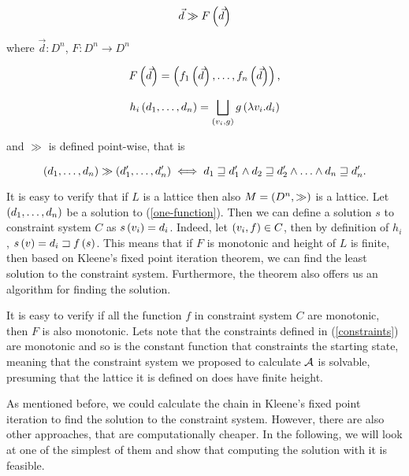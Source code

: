 \documentclass[..thesis.tex]{subfiles}
\begin{document}
\begin{equation}
  \label{one-function}
  \vec{d} \gg F \left( \vec{d}  \right) 
\end{equation}


where $\vec{d} : D^n$, $F :  D^{n} \to D^{n}$

\begin{equation*}
  F \left( \vec{d} \right)  = \left( f_1 \left( \vec{d} \right) , \ldots, f_n \left( \vec{d} \right) \right) \text{,}
\end{equation*}   


\begin{equation*}
  h_i \left( d_1, \ldots, d_n \right) = \bigsqcup_{\left( v_i, g \right)} g \left( \lambda v_i. d_i \right)
\end{equation*}

and $\gg$ is defined point-wise, that is 

\begin{equation*}
\left( d_1, \ldots, d_n \right) \gg \left( d_1', \ldots, d_n' \right) \iff  d_1 \sqsupseteq d_1' \land d_2 \sqsupseteq d_2' \land \ldots \land d_n \sqsupseteq d_n' \text{.}
\end{equation*}

It is easy to verify that if $L$ is a lattice then also $M = \left( D^n, \gg \right)$ is a lattice. Let $\left( d_1, \ldots, d_n \right) $ be a solution to (\ref{one-function}). Then we can define a solution $s$ to constraint system $C$ as $s \left( v_i \right) = d_i$. Indeed, let $ \left( v_i, f \right) \in C$, then by definition of $h_i$, $s \left( v \right) = d_i \sqsupset f \left( s \right)$. This means that if $F$ is monotonic and height of $L$ is finite, then based on Kleene's fixed point iteration theorem, we can find the least solution to the constraint system. Furthermore, the theorem also offers us an algorithm for finding the solution.

It is easy to verify if all the function $f$ in constraint system $C$ are monotonic, then $F$ is also monotonic. Lets note that the constraints defined in (\ref{constraints}) are monotonic and so is the constant function that constraints the starting state, meaning that the constraint system we proposed to calculate $\mathcal{A}$ is solvable, presuming that the lattice it is defined on does have finite height.


As mentioned before, we could calculate the chain in Kleene's fixed point iteration to find the solution to the constraint system. However, there are also other approaches, that are computationally cheaper. In the following, we will look at one of the simplest of them and show that computing the solution with it is feasible.
\end{document}
